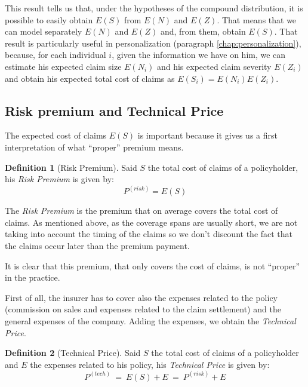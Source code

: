 \documentclass[a4paper, nobind]{templates/ociamthesis}
\theoremstyle{definition}
\newtheorem{definition}{Definition}[chapter]
\theoremstyle{definition}
\theoremstyle{definition}
\theoremstyle{remark}
\begin{document}
This result tells us that, under the hypotheses of the compound distribution, it is possible to easily obtain \(E(S)\) from \(E(N)\) and \(E(Z)\). That means that we can model separately \(E(N)\) and \(E(Z)\) and, from them, obtain \(E(S)\). That result is particularly useful in personalization (paragraph \ref{chap:personalization}), because, for each individual \(i\), given the information we have on him, we can estimate his expected claim size \(E(N_i)\) and his expected claim severity \(E(Z_i)\) and obtain his expected total cost of claims as \(E(S_i) = E(N_i) E(Z_i)\).

\hypertarget{chap:risk-prem-tech-price}{%
\subsection{Risk premium and Technical Price}\label{chap:risk-prem-tech-price}}

The expected cost of claims \(E(S)\) is important because it gives us a first interpretation of what ``proper'' premium means.

\begin{definition}[Risk Premium]
\label{def:risk-premium} \iffalse (Risk Premium) \fi{} Said \(S\) the total cost of claims of a policyholder, his \emph{Risk Premium} is given by:
\[
P^{(risk)} = E(S)
\]
\end{definition}

The \emph{Risk Premium} is the premium that on average covers the total cost of claims. As mentioned above, as the coverage spans are usually short, we are not taking into account the timing of the claims so we don't discount the fact that the claims occur later than the premium payment.

It is clear that this premium, that only covers the cost of claims, is not ``proper'' in the practice.

First of all, the insurer has to cover also the expenses related to the policy (commission on sales and expenses related to the claim settlement) and the general expenses of the company. Adding the expenses, we obtain the \emph{Technical Price}.

\begin{definition}[Technical Price]
\label{def:technical-price} \iffalse (Technical Price) \fi{} Said \(S\) the total cost of claims of a policyholder and \(E\) the expenses related to his policy, his \emph{Technical Price} is given by:
\[
P^{(tech)} \ = \ E(S) + E \ = \ P^{(risk)} + E
\]
\end{definition}
\end{document}
